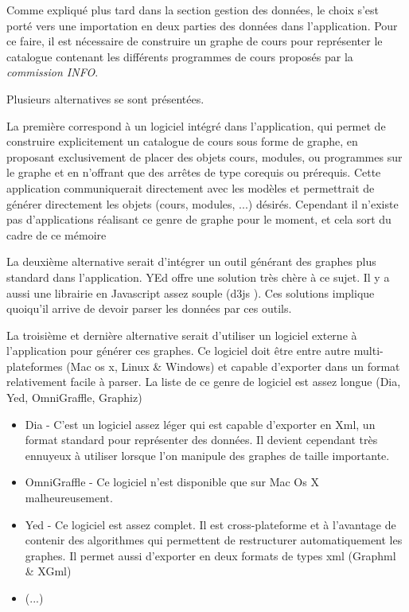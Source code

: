 Comme expliqué plus tard dans la section gestion des données, le choix s'est porté vers une importation en deux parties des données dans l'application. Pour ce faire, il est nécessaire de construire un graphe de cours pour représenter le catalogue contenant les différents programmes de cours proposés par la \textit{commission INFO}.

Plusieurs alternatives se sont présentées.

La première correspond à un logiciel intégré dans l'application, qui permet de construire explicitement un catalogue de cours sous forme de graphe, en proposant exclusivement de placer des objets cours, modules, ou programmes sur le graphe et en n'offrant que des arrêtes de type corequis ou prérequis. Cette application communiquerait directement avec les modèles et permettrait de générer directement les objets (cours, modules, ...) désirés. Cependant il n'existe pas d'applications réalisant ce genre de graphe pour le moment, et cela sort du cadre de ce mémoire

La deuxième alternative serait d'intégrer un outil générant des graphes plus standard dans l'application. YEd offre une solution très chère à ce sujet. Il y a aussi une librairie en Javascript assez souple (d3js ). Ces solutions implique quoiqu'il arrive de devoir parser les données par ces outils.

La troisième et dernière alternative serait d'utiliser un logiciel externe à l'application pour générer ces graphes. Ce logiciel doit être entre autre multi-plateformes (Mac os x, Linux \& Windows) et capable d'exporter dans un format relativement facile à parser. La liste de ce genre de logiciel est assez longue (Dia, Yed, OmniGraffle, Graphiz)
\begin{itemize}
  \item Dia - C'est un logiciel assez léger qui est capable d'exporter en Xml, un format standard pour représenter des données. Il devient cependant très ennuyeux à utiliser lorsque l'on manipule des graphes de taille importante.
  \item OmniGraffle - Ce logiciel n'est disponible que sur Mac Os X malheureusement.
  \item Yed - Ce logiciel est assez complet. Il est cross-plateforme et à l'avantage de contenir des algorithmes qui permettent de restructurer automatiquement les graphes. Il permet aussi d'exporter en deux formats de types xml (Graphml \& XGml)
  \item (...)
\end{itemize}

